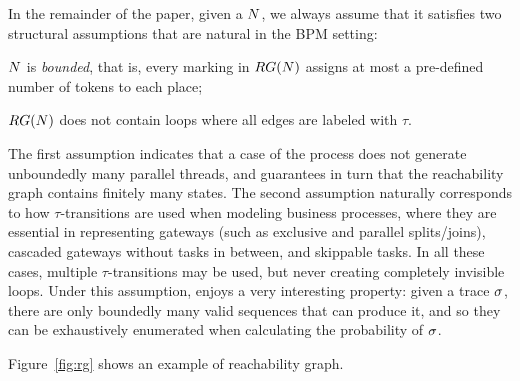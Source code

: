 In the remainder of the paper, given a \uswn $N$, we always assume that it satisfies two structural assumptions that are natural in the BPM setting:
\begin{compactitem}
\item $N$ is \emph{bounded}, that is, every marking in $RG(N)$ assigns at most a pre-defined number of tokens to each place;
\item $RG(N)$ does not contain loops where all edges are labeled with $\tau$.   
\end{compactitem}
The first assumption indicates that a case of the process does not generate unboundedly many parallel threads, and guarantees in turn that the reachability graph contains finitely many states. The second assumption naturally corresponds to how $\tau$-transitions are used when modeling business processes, where they are essential in representing gateways (such as exclusive and parallel splits/joins), cascaded gateways without tasks in between, and skippable tasks.  In all these cases, multiple $\tau$-transitions may be used, but never creating completely invisible loops. Under this assumption, \net enjoys a very interesting property: given a trace $\sigma$, there are only boundedly many valid sequences that can produce it, and so they can be exhaustively enumerated when calculating the probability of $\sigma$. 

Figure~\eqref{fig:rg} shows an example of reachability graph.





